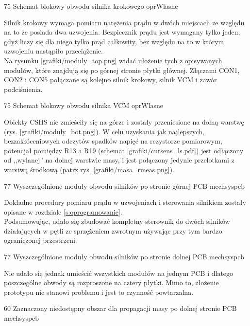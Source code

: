 	{75}
	{Schemat blokowy obwodu silnika krokowego}
	{oprWlasne}
	
Silnik krokowy wymaga pomiaru natężenia prądu w dwóch miejscach ze względu na to że posiada dwa uzwojenia. Bezpiecznik prądu jest wymagany tylko jeden, gdyż liczy się dla niego tylko prąd całkowity, bez względu na to w którym uzwojeniu nastąpiło przeciążenie. \\

Na rysunku \ref{grafiki/moduly_top.png} widać ułożenie tych z opisywanych modułów, które znajdują się po górnej stronie płytki głównej. Złączami CON1, CON2 i CON5 połączane są kolejno silnik krokowy, silnik VCM i zawór podciśnienia.
	
	{75}
	{Schemat blokowy obwodu silnika VCM}
	{oprWlasne}
	
Obiekty CSHS nie zmieściły się na górze i zostały przeniesione na dolną warstwę (rys. \ref{grafiki/moduly_bot.png}). W celu uzyskania jak najlepszych, bezzakłóceniowych odczytów spadków napięć na rezystorze pomiarowym, potencjał pomiędzy R13 a R19 (schemat \ref{grafiki/cursens_ls.pdf}) jest odłączony od ,,wylanej'' na dolnej warstwie masy, i jest połączony jedynie przelotkami z warstwą środkową (patrz rys. \ref{grafiki/masa_rmeas.png}). 	
	
	{77}
	{Wyszczególnione moduły obwodu silników po stronie górnej PCB}
	{mechsyspcb}

Dokładne procedury pomiaru prądu w uzwojeniach i sterowania silnikiem zostały opisane w rozdziale \ref{s:oprogramowanie}. \\

Podsumowując, udało się zbudować kompletny sterownik do dwóch silników działających w pętli ze sprzężeniem zwrotnym używając przy tym bardzo ograniczonej przestrzeni. 

	{77}
	{Wyszczególnione moduły obwodu silników po stronie dolnej PCB}
	{mechsyspcb}
	
Nie udało się jednak umieścić wszystkich modułów na jednym PCB i dlatego poszczególne obwody są rozproszone na cztery płytki. Mimo to, złożenie prototypu nie stanowi problemu i jest to czynność powtarzalna.

	{60}
	{Zaznaczony niedostępny obszar dla propagacji masy po dolnej stronie PCB}
	{mechsyspcb}








\clearpage














